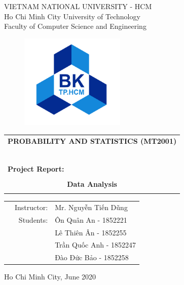 \documentclass[a4paper]{article}
\begin{document}
\begin{titlepage}
\begin{center}
VIETNAM NATIONAL UNIVERSITY - HCM \\
Ho Chi Minh City University of Technology \\
Faculty of Computer Science and Engineering 
\end{center}

\vspace{1cm}

\begin{figure}[h!]
\begin{center}
\includegraphics[width=5cm]{img/hcmut.png}
\end{center}
\end{figure}

\vspace{1cm}


\begin{center}
\begin{tabular}{c}
\multicolumn{1}{l}{\textbf{{\Large {\color{blue}PROBABILITY AND STATISTICS (MT2001)}}}}\\
~~\\
\hline
\\
\multicolumn{1}{l}{\textbf{{\Large {\color{blue}Project Report: }}}}\\
\\
\textbf{{\Huge {\color{blue}Data Analysis}}}\\
\\
\hline
\end{tabular}
\end{center}

\vspace{1.5cm}

\begin{table}[h]
\begin{tabular}{rrl}
\hspace{7 cm} &Instructor: & Mr. Nguyễn Tiến Dũng \\
& Students: & Ôn Quân An - 1852221 \\
& & Lê Thiên Ân - 1852255 \\
& & Trần Quốc Anh - 1852247 \\
& & Đào Đức Bảo - 1852258 \\
\end{tabular}
\end{table}
\vspace{1.7cm}
\begin{center}
{\footnotesize Ho Chi Minh City, June 2020}
\end{center}
\end{titlepage}
\end{document}
